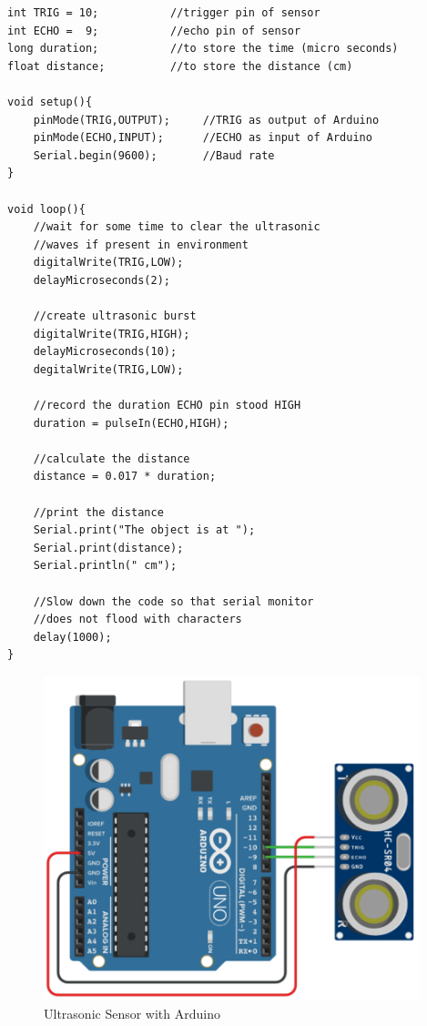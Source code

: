 \begin{lstlisting}[style=CStyle]
int TRIG = 10;           //trigger pin of sensor
int ECHO =  9;           //echo pin of sensor
long duration;           //to store the time (micro seconds)
float distance;          //to store the distance (cm)

void setup(){
    pinMode(TRIG,OUTPUT);     //TRIG as output of Arduino
    pinMode(ECHO,INPUT);      //ECHO as input of Arduino
    Serial.begin(9600);       //Baud rate
}

void loop(){
    //wait for some time to clear the ultrasonic
    //waves if present in environment
    digitalWrite(TRIG,LOW);
    delayMicroseconds(2);
    
    //create ultrasonic burst
    digitalWrite(TRIG,HIGH);
    delayMicroseconds(10);
    degitalWrite(TRIG,LOW);
    
    //record the duration ECHO pin stood HIGH
    duration = pulseIn(ECHO,HIGH);
    
    //calculate the distance
    distance = 0.017 * duration;
    
    //print the distance
    Serial.print("The object is at ");
    Serial.print(distance);
    Serial.println(" cm");
    
    //Slow down the code so that serial monitor
    //does not flood with characters
    delay(1000);					
}
\end{lstlisting}

\begin{figure}[h!]	
	\centering
	\includegraphics[width=4.3in]{Images/Ultrasonic/circuit1.png}
    \caption{Ultrasonic Sensor with Arduino}
\end{figure}

